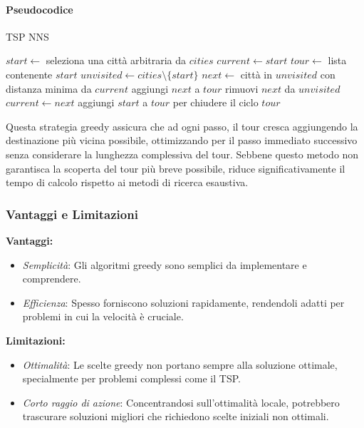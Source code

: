 
\paragraph{Pseudocodice}

\begin{algorithm}
	\caption{TSP \Gls{NNS}}\label{alg:greedybestfirst}
	\begin{algorithmic}[1]
		\State $start \gets$ seleziona una città arbitraria da $cities$
		\State $current \gets start$
		\State $tour \gets$ lista contenente $start$
		\State $unvisited \gets cities \setminus \{start\}$
		\State $next \gets$ città in $unvisited$ con distanza minima da $current$
		\State aggiungi $next$ a $tour$
		\State rimuovi $next$ da $unvisited$
		\State $current \gets next$
		\EndWhile
		\State aggiungi $start$ a $tour$ per chiudere il ciclo
		\State \Return $tour$
		\EndProcedure
	\end{algorithmic}
\end{algorithm}

Questa strategia greedy assicura che ad ogni passo, il tour cresca aggiungendo la destinazione più vicina possibile, ottimizzando per il passo immediato successivo senza considerare la lunghezza complessiva del tour. Sebbene questo metodo non garantisca la scoperta del tour più breve possibile, riduce significativamente il tempo di calcolo rispetto ai metodi di ricerca esaustiva.


\subsubsection{Vantaggi e Limitazioni}

\textbf{Vantaggi:}
\begin{itemize}
	\item \textit{Semplicità}: Gli algoritmi greedy sono semplici da implementare e comprendere.
	\item \textit{Efficienza}: Spesso forniscono soluzioni rapidamente, rendendoli adatti per problemi in cui la velocità è cruciale.
\end{itemize}

\textbf{Limitazioni:}
\begin{itemize}
	\item \textit{Ottimalità}: Le scelte greedy non portano sempre alla soluzione ottimale, specialmente per problemi complessi come il \Gls{TSP}.
	\item \textit{Corto raggio di azione}: Concentrandosi sull'ottimalità locale, potrebbero trascurare soluzioni migliori che richiedono scelte iniziali non ottimali.
\end{itemize}

